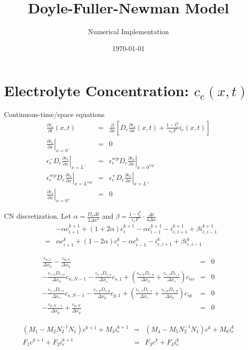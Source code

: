 \documentclass[reqno, 11pt]{amsart}
\title{Doyle-Fuller-Newman Model}
\author{Numerical Implementation}
\date{\today}                                           %
\begin{document}
\maketitle

\section{Electrolyte Concentration: $c_{e}(x,t)$}
Continuous-time/space equations
\begin{eqnarray}
	\frac{\partial c_{e}}{\partial t}(x,t) &=& \frac{\partial}{\partial x} \left[D_{e} \frac{\partial c_{e}}{\partial x}(x,t) + \frac{1 - t^{0}_{c}}{\epsilon_{e} F} i_{e}(x,t) \right] \\
	\left. \frac{\partial c_{e}}{\partial x} \right|_{x = 0^{-}} &=& 0 \\
	\epsilon_{e}^{-} D_{e} \left. \frac{\partial c_{e}}{\partial x} \right|_{x = L^{-}} &=& \epsilon_{e}^{sep} D_{e} \left. \frac{\partial c_{e}}{\partial x} \right|_{x = 0^{sep}} \\
	\epsilon_{e}^{sep} D_{e} \left. \frac{\partial c_{e}}{\partial x} \right|_{x = L^{sep}} &=& \epsilon_{e}^{+} D_{e} \left. \frac{\partial c_{e}}{\partial x} \right|_{x = L^{+}} \\
	\left. \frac{\partial c_{e}}{\partial x} \right|_{x = 0^{+}} &=& 0
\end{eqnarray}


CN discretization. Let $\alpha = \frac{D_{e} \Delta t}{2 \Delta x^{2}}$ and $\beta = \frac{1 - t_{c}^{0}}{\epsilon_{e} F} \cdot \frac{\Delta t}{4 \Delta x}$
\begin{eqnarray}
	&& -\alpha c_{i+1}^{k+1} + (1 + 2 \alpha) c_{i}^{k+1} - \alpha c_{i-1}^{k+1} - i_{e,i+1}^{k+1} + \beta i_{e,i-1}^{k+1} \nonumber \\
	&=& \alpha c_{i+1}^{k} + (1 - 2 \alpha) c_{i}^{k} - \alpha c_{i-1}^{k} - i_{e,i+1}^{k} + \beta i_{e,i-1}^{k} 
\end{eqnarray}

\begin{eqnarray}
	\frac{c_{n,1}}{\Delta x_{n}} - \frac{c_{n,0}}{\Delta x_{n}} &=& 0 \\
	-\frac{\epsilon_{e,n} D_{e,n}}{\Delta x_{n}} c_{n,N-1} -\frac{\epsilon_{e,s} D_{e,s}}{\Delta x_{s}} c_{s,1} + \left( \frac{\epsilon_{e,n} D_{e,n}}{\Delta x_{n}} + \frac{\epsilon_{e,s} D_{e,s}}{\Delta x_{s}} \right) c_{ns} &=& 0 \\
	-\frac{\epsilon_{e,s} D_{e,s}}{\Delta x_{s}} c_{s,N-1} -\frac{\epsilon_{e,p} D_{e,p}}{\Delta x_{p}} c_{p,1} + \left( \frac{\epsilon_{e,s} D_{e,s}}{\Delta x_{s}} + \frac{\epsilon_{e,p} D_{e,p}}{\Delta x_{p}} \right) c_{sp} &=& 0 \\
	-\frac{c_{p,N-1}}{\Delta x_{p}} + \frac{c_{p,N}}{\Delta x_{p}} &=& 0
\end{eqnarray}

\begin{eqnarray}
	(M_{1} - M_{2} N_{2}^{-1} N_{1}) c^{k+1} + M_{3} i_{e}^{k+1} &=& (M_{4} - M_{5} N_{2}^{-1} N_{1}) c^{k} + M_{6} i_{e}^{k} \\
	F_{1} c^{k+1} + F_{2} i_{e}^{k+1} &=& F_{3} c^{k} + F_{4} i_{e}^{k}
\end{eqnarray}
\end{document}

